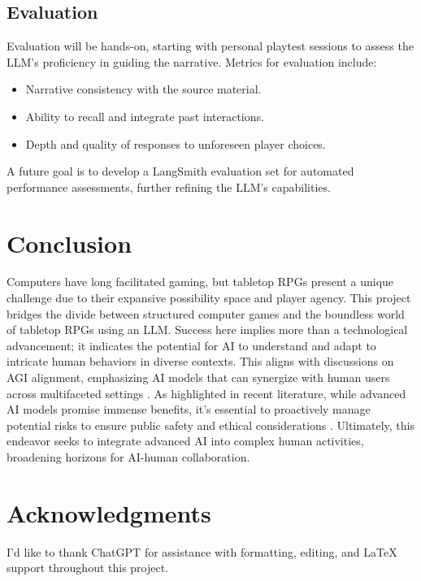 \documentclass[12pt]{article}
\begin{document}
\subsection{Evaluation}

Evaluation will be hands-on, starting with personal playtest sessions to assess the LLM's proficiency in guiding the narrative. Metrics for evaluation include:

\begin{itemize}
\item Narrative consistency with the source material.
\item Ability to recall and integrate past interactions.
\item Depth and quality of responses to unforeseen player choices.
\end{itemize}

A future goal is to develop a LangSmith evaluation set for automated performance assessments, further refining the LLM's capabilities.

\section{Conclusion}
Computers have long facilitated gaming, but tabletop RPGs present a unique challenge due to their expansive possibility space and player agency. This project bridges the divide between structured computer games and the boundless world of tabletop RPGs using an LLM. Success here implies more than a technological advancement; it indicates the potential for AI to understand and adapt to intricate human behaviors in diverse contexts. This aligns with discussions on AGI alignment, emphasizing AI models that can synergize with human users across multifaceted settings \cite{Anderljung2023FrontierAR}. As highlighted in recent literature, while advanced AI models promise immense benefits, it's essential to proactively manage potential risks to ensure public safety and ethical considerations \cite{Anderljung2023FrontierAR}. Ultimately, this endeavor seeks to integrate advanced AI into complex human activities, broadening horizons for AI-human collaboration.

\section*{Acknowledgments}
I'd like to thank ChatGPT \cite{ChatGPT2023} for assistance with formatting, editing, and LaTeX support throughout this project.



\end{document}
